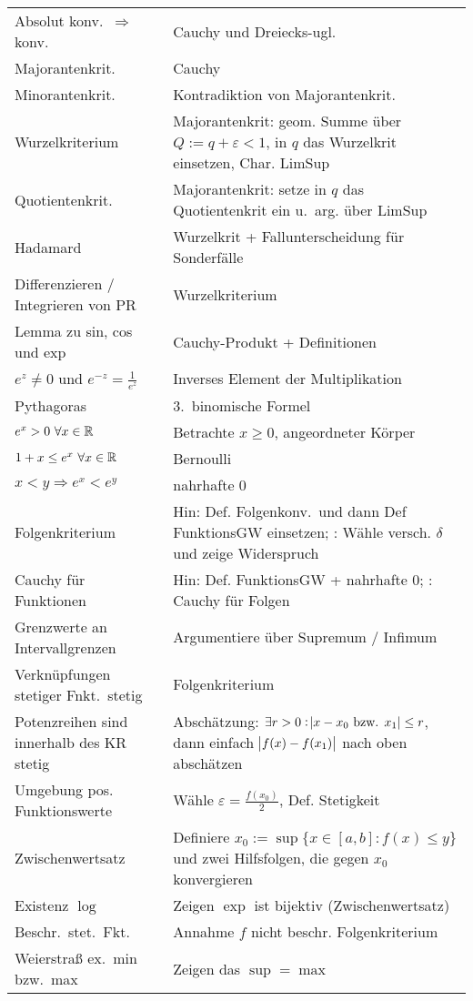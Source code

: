 \begin{center}
\begin{longtable}{lp{6cm}}
            Absolut konv.\ $\Rightarrow$  konv. & Cauchy und Dreiecks-ugl.\\
            Majorantenkrit. & Cauchy\\
            Minorantenkrit. & Kontradiktion von Majorantenkrit.\\
            Wurzelkriterium & Majorantenkrit: geom. Summe über $Q:=q+\varepsilon<1$, in $q$ das Wurzelkrit einsetzen, Char. LimSup\\
            Quotientenkrit. & Majorantenkrit: setze in $q$ das Quotientenkrit ein u.\ arg. über LimSup \\
            Hadamard & Wurzelkrit + Fallunterscheidung für Sonderfälle\\
            Differenzieren / Integrieren von PR & Wurzelkriterium\\
            Lemma zu sin, cos und exp & Cauchy-Produkt + Definitionen\\
            $e^z \neq 0$ und $e^{-z} = \frac{1}{e^{z}}$ & Inverses Element der Multiplikation\\
            Pythagoras & 3.\ binomische Formel\\
            $e^x > 0\ \forall x \in \R$ & Betrachte $x \geq 0$, angeordneter Körper\\
            $1+x \leq e^x\ \forall x \in \R$ & Bernoulli\\
            $x<y \Rightarrow e^x < e^y$ & nahrhafte 0\\
            Folgenkriterium & Hin: Def. Folgenkonv.\ und dann Def FunktionsGW einsetzen; : Wähle versch. $\delta$ und zeige Widerspruch\\
            Cauchy für Funktionen & Hin: Def. FunktionsGW + nahrhafte 0; : Cauchy für Folgen\\
            Grenzwerte an Intervallgrenzen & Argumentiere über Supremum / Infimum\\
            Verknüpfungen stetiger Fnkt.\ stetig & Folgenkriterium\\
            Potenzreihen sind innerhalb des KR stetig & Abschätzung: $\exists r>0 : \abs{x-x_0 \text{ bzw. } x_1} \leq r$, dann einfach $\abs{f(x)-f(x_1)}$ nach oben abschätzen\\
            Umgebung pos. Funktionswerte & Wähle $\varepsilon = \frac{f(x_0)}{2}$, Def. Stetigkeit\\
            Zwischenwertsatz & Definiere $x_0 := \sup \{x \in [a,b] : f(x) \leq y \}$ und zwei Hilfsfolgen, die gegen $x_0$ konvergieren\\
            Existenz $\log$ & Zeigen $\exp$ ist bijektiv (Zwischenwertsatz)\\
            Beschr.\ stet.\ Fkt.\ & Annahme $f$ nicht beschr. Folgenkriterium\\
            Weierstraß ex.\ min bzw.\ max & Zeigen das $\sup=\max$\\
        \bottomrule
    \end{longtable}
\end{center}
